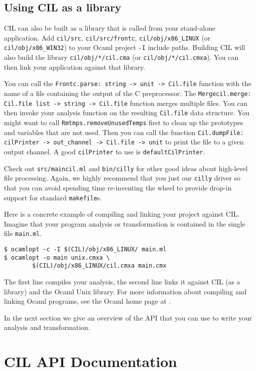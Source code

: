 \documentclass{article}
\def\t#1{{\tt #1}}
\begin{document}
\subsection{Using CIL as a library}

CIL can also be built as a library that is called from your stand-alone
application. Add \t{cil/src}, \t{cil/src/frontc}, \t{cil/obj/x86\_LINUX}
(or \t{cil/obj/x86\_WIN32}) to your Ocaml project \t{-I} include paths.
Building CIL will also build the library \t{cil/obj/*/cil.cma} (or
\t{cil/obj/*/cil.cmxa}). You can then link your application against that
library. 

You can call the \t{Frontc.parse: string -> unit -> Cil.file} function with
the name of a file containing the output of the C preprocessor.
The \t{Mergecil.merge: Cil.file list -> string -> Cil.file} function merges
multiple files. You can then invoke your analysis function on the resulting
\t{Cil.file} data structure.  You might want to call
\t{Rmtmps.removeUnusedTemps} first to clean up the prototypes and variables
that are not used. Then you can call the function \t{Cil.dumpFile:
cilPrinter -> out\_channel -> Cil.file -> unit} to print the file to a
given output channel. A good \t{cilPrinter} to use is
\t{defaultCilPrinter}. 

Check out \t{src/maincil.ml} and \t{bin/cilly} for other good ideas
about high-level file processing. Again, we highly recommend that you just
our \t{cilly} driver so that you can avoid spending time re-inventing the
wheel to provide drop-in support for standard \t{makefile}s. 

Here is a concrete example of compiling and linking your project against
CIL. Imagine that your program analysis or transformation is contained in
the single file \t{main.ml}. 

\begin{verbatim}
$ ocamlopt -c -I $(CIL)/obj/x86_LINUX/ main.ml
$ ocamlopt -o main unix.cmxa \ 
        $(CIL)/obj/x86_LINUX/cil.cmxa main.cmx
\end{verbatim}

The first line compiles your analysis, the second line links it against CIL
(as a library) and the Ocaml Unix library. For more information about
compiling and linking Ocaml programs, see the Ocaml home page
at . 

In the next section we give an overview of the API that you can use
to write your analysis and transformation. 
 
\section{CIL API Documentation}\label{sec-api} 
\end{document}
